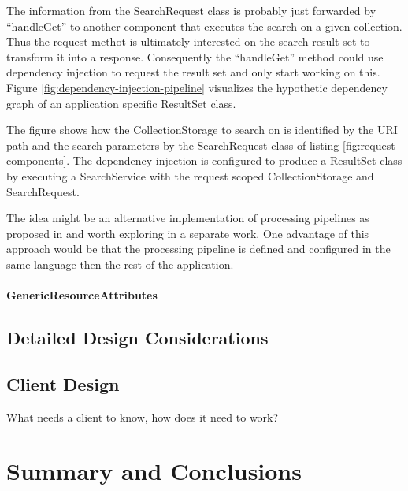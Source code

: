 \documentclass[12pt,a4paper]{scrartcl}		%
\begin{document}
The information from the SearchRequest class is probably just forwarded by
``handleGet'' to another component that executes the search on a given
collection. Thus the request methot is ultimately interested on the search
result set to transform it into a response. Consequently the ``handleGet''
method could use dependency injection to request the result set and only start
working on this. Figure \ref{fig:dependency-injection-pipeline} visualizes the
hypothetic dependency graph of an application specific ResultSet class.

The figure shows how the CollectionStorage to search on is identified by the URI
path and the search parameters by the SearchRequest class of listing
\ref{fig:request-components}. The dependency injection is configured to produce
a ResultSet class by executing a SearchService with the request scoped
CollectionStorage and SearchRequest.

The idea might be an alternative implementation of processing pipelines as
proposed in \cite{Davis:2011:XTR:1967428.1967437} and worth exploring in a
separate work. One advantage of this approach would be that the processing
pipeline is defined and configured in the same language then the rest of the
application.

\paragraph{GenericResourceAttributes}
\label{sec:component-genericresourceattrib}




\subsection{Detailed Design Considerations}

\subsection{Client Design}

What needs a client to know, how does it need to work?



\section{Summary and Conclusions}

\newpage
{}

\end{document}
